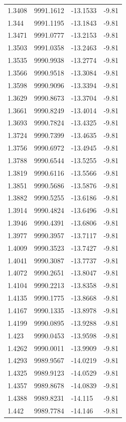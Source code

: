 \begin{table}[H]
\begin{tabular}{llll}
1.3408 & 9991.1612 & -13.1533 & -9.81 \\
1.344 & 9991.1195 & -13.1843 & -9.81 \\
1.3471 & 9991.0777 & -13.2153 & -9.81 \\
1.3503 & 9991.0358 & -13.2463 & -9.81 \\
1.3535 & 9990.9938 & -13.2774 & -9.81 \\
1.3566 & 9990.9518 & -13.3084 & -9.81 \\
1.3598 & 9990.9096 & -13.3394 & -9.81 \\
1.3629 & 9990.8673 & -13.3704 & -9.81 \\
1.3661 & 9990.8249 & -13.4014 & -9.81 \\
1.3693 & 9990.7824 & -13.4325 & -9.81 \\
1.3724 & 9990.7399 & -13.4635 & -9.81 \\
1.3756 & 9990.6972 & -13.4945 & -9.81 \\
1.3788 & 9990.6544 & -13.5255 & -9.81 \\
1.3819 & 9990.6116 & -13.5566 & -9.81 \\
1.3851 & 9990.5686 & -13.5876 & -9.81 \\
1.3882 & 9990.5255 & -13.6186 & -9.81 \\
1.3914 & 9990.4824 & -13.6496 & -9.81 \\
1.3946 & 9990.4391 & -13.6806 & -9.81 \\
1.3977 & 9990.3957 & -13.7117 & -9.81 \\
1.4009 & 9990.3523 & -13.7427 & -9.81 \\
1.4041 & 9990.3087 & -13.7737 & -9.81 \\
1.4072 & 9990.2651 & -13.8047 & -9.81 \\
1.4104 & 9990.2213 & -13.8358 & -9.81 \\
1.4135 & 9990.1775 & -13.8668 & -9.81 \\
1.4167 & 9990.1335 & -13.8978 & -9.81 \\
1.4199 & 9990.0895 & -13.9288 & -9.81 \\
1.423 & 9990.0453 & -13.9598 & -9.81 \\
1.4262 & 9990.0011 & -13.9909 & -9.81 \\
1.4293 & 9989.9567 & -14.0219 & -9.81 \\
1.4325 & 9989.9123 & -14.0529 & -9.81 \\
1.4357 & 9989.8678 & -14.0839 & -9.81 \\
1.4388 & 9989.8231 & -14.115 & -9.81 \\
1.442 & 9989.7784 & -14.146 & -9.81 \\

\end{tabular}
\end{table}
